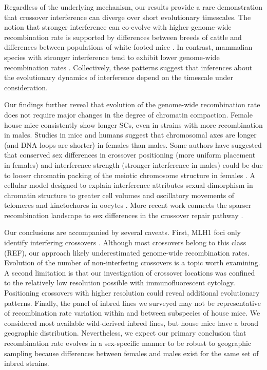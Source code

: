 \documentclass[9pt,lineno]{elife}
\begin{document}
Regardless of the underlying mechanism, our results provide a rare demonstration that crossover interference can diverge over short evolutionary timescales. The notion that stronger interference can co-evolve with higher genome-wide recombination rate is supported by differences between breeds of cattle \citep{ma2015_cattle} and differences between populations of white-footed mice \citep{peterson2019}. In contrast, mammalian species with stronger interference tend to exhibit lower genome-wide recombination rates \citep{segura2013, @ottoPaysuer2019}. Collectively, these patterns suggest that inferences about the evolutionary dynamics of interference depend on the timescale under consideration.

Our findings further reveal that evolution of the genome-wide recombination rate does not require major changes in the degree of chromatin compaction. Female house mice consistently show longer SCs, even in strains with more recombination in males. Studies in mice \citep{lynn2002, petkov2007} and humans \citep{gruhn2013, tease2004} suggest that chromosomal axes are longer (and DNA loops are shorter) in females than males. Some authors have suggested that conserved sex differences in crossover positioning (more uniform placement in females) and interference strength (stronger interference in males) could be due to looser chromatin packing of the meiotic chromosome structure in females \citep{haenel2018; @petkov2007}. A cellular model designed to explain interference attributes sexual dimorphism in chromatin structure to greater cell volumes and oscillatory movements of telomeres and kinetochores in oocytes \citep{@hulten2011_COM}. More recent work connects the sparser recombination landscape to sex differences in the crossover repair pathway \citep{wang2017inefficient}.

Our conclusions are accompanied by several caveats. First, MLH1 foci only identify interfering crossovers \citep{holloway2008mus81}. Although most crossovers belong to this class (REF), our approach likely underestimated genome-wide recombination rates. Evolution of the number of non-interfering crossovers is a topic worth examining. A second limitation is that our investigation of crossover locations was confined to the relatively low resolution possible with immunofluorescent cytology. Positioning crossovers with higher resolution could reveal additional evolutionary patterns. Finally, the panel of inbred lines we surveyed may not be representative of recombination rate variation within and between subspecies of house mice. We considered most available wild-derived inbred lines, but house mice have a broad geographic distribution. Nevertheless, we expect our primary conclusion that recombination rate evolves in a sex-specific manner to be robust to geographic sampling because differences between females and males exist for the same set of inbred strains.
\end{document}
